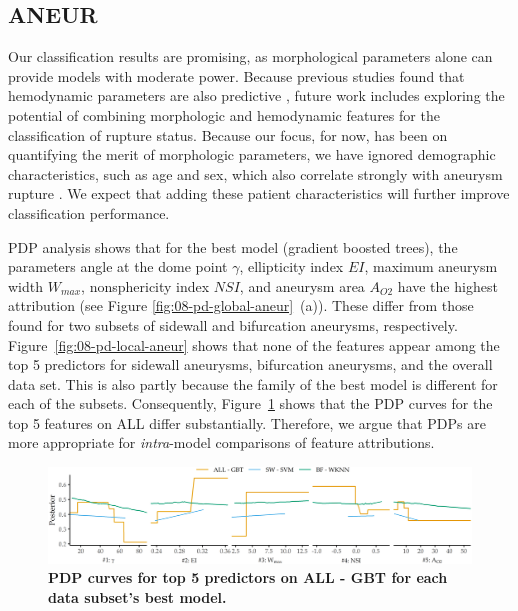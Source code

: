 \documentclass[
  oneside]{book}
\begin{document}
\hypertarget{iml-discussion-aneur}{%
\subsection{ANEUR}\label{iml-discussion-aneur}}

Our classification results are promising, as morphological parameters alone can provide models with moderate power.
Because previous studies found that hemodynamic parameters are also predictive \autocite{CebralEtAl:Neuroradiology2011,BergBeuing:CARS2018}, future work includes exploring the potential of combining morphologic and hemodynamic features for the classification of rupture status.
Because our focus, for now, has been on quantifying the merit of morphologic parameters, we have ignored demographic characteristics, such as age and sex, which also correlate strongly with aneurysm rupture \autocite{detmer2018development}.
We expect that adding these patient characteristics will further improve classification performance.

PDP analysis shows that for the best model (gradient boosted trees), the parameters angle at the dome point \(\gamma\), ellipticity index \(EI\), maximum aneurysm width \(W_{max}\), nonsphericity index \(NSI\), and aneurysm area \(A_{O2}\) have the highest attribution (see Figure \ref{fig:08-pd-global-aneur}~(a)).
These differ from those found for two subsets of sidewall and bifurcation aneurysms, respectively.
Figure~\ref{fig:08-pd-local-aneur} shows that none of the features appear among the top 5 predictors for sidewall aneurysms, bifurcation aneurysms, and the overall data set.
This is also partly because the family of the best model is different for each of the subsets.
Consequently, Figure~\ref{fig:08-pd-local-aneur-discussion} shows that the PDP curves for the top 5 features on ALL differ substantially.
Therefore, we argue that PDPs are more appropriate for \emph{intra}-model comparisons of feature attributions.



\begin{figure}[htb]

{\centering \includegraphics[width=1\linewidth]{figures/08-pd-local-aneur-discussion} 

}

\caption{\textbf{PDP curves for top 5 predictors on ALL - GBT for each data subset's best model.}}\label{fig:08-pd-local-aneur-discussion}
\end{figure}
\end{document}

